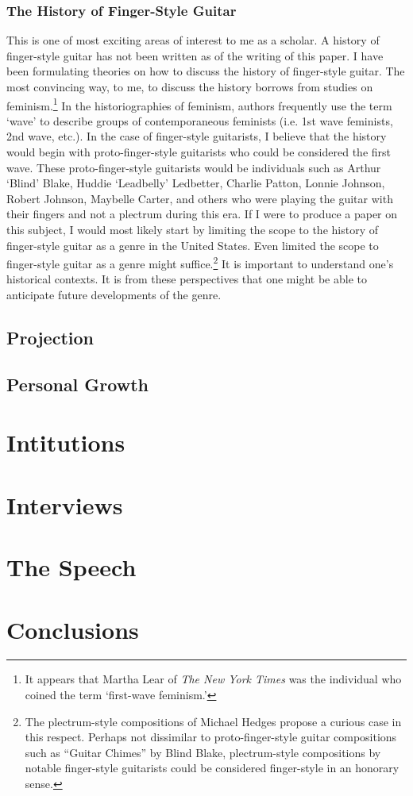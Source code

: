 \documentclass[12pt]{article}
\begin{document}
\subsubsection{The History of Finger-Style Guitar}
\label{sec:history-finger-style}
This is one of most exciting areas of interest to me as a scholar. A
history of finger-style guitar has not been written as of the writing
of this paper. I have been formulating theories on how to discuss the
history of finger-style guitar. The most convincing way, to me, to
discuss the history borrows from studies on feminism.\footnote{It
  appears that Martha Lear of \emph{The New York Times} was the
  individual who coined the term `first-wave feminism.'} In the
historiographies of feminism, authors frequently use the term `wave'
to describe groups of contemporaneous feminists (i.e. 1st wave
feminists, 2nd wave, etc.). In the case of finger-style guitarists, I
believe that the history would begin with proto-finger-style
guitarists who could be considered the first wave. These
proto-finger-style guitarists would be individuals such as Arthur
`Blind' Blake, Huddie `Leadbelly' Ledbetter, Charlie Patton, Lonnie
Johnson, Robert Johnson, Maybelle Carter, and others who were playing
the guitar with their fingers and not a plectrum during this era. If I
were to produce a paper on this subject, I would most likely start by
limiting the scope to the history of finger-style guitar as a genre in
the United States. Even limited the scope to finger-style guitar as a
genre might suffice.\footnote{The plectrum-style compositions of
  Michael Hedges propose a curious case in this respect. Perhaps not
  dissimilar to proto-finger-style guitar compositions such as
  ``Guitar Chimes'' by Blind Blake, plectrum-style compositions by
  notable finger-style guitarists could be considered finger-style in
  an honorary sense.} It is important to understand one's historical
contexts. It is from these perspectives that one might be able to
anticipate future developments of the genre.

\subsection{Projection}
\label{sec:projection}

\subsection{Personal Growth}
\label{sec:personal-growth}

\section{Intitutions}
\label{sec:intitutions}

\section{Interviews}
\label{sec:interviews}

\section{The Speech}
\label{sec:speech}

\section{Conclusions}
\label{sec:conclusions}
\end{document}
